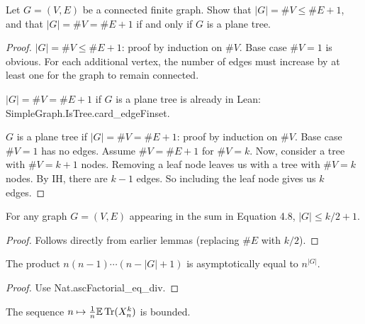 



\begin{proposition}%
  \label{prop:tree_vertex_inequality}
  \notready
  Let $G=(V,E)$ be a connected finite graph. Show that $|G|=\#V\le \#E+1$, and that $|G|=\#V=\#E+1$ if and only if $G$ is a plane tree.
\end{proposition}

\begin{proof}
  \notready
  $|G|= \#V\le \#E+1$: proof by induction on $\#V$. Base case $\#V = 1$ is obvious. For each additional vertex, the number of edges must increase by at least one for the graph to remain connected.

  $|G|=\#V=\#E+1$ if $G$ is a plane tree is already in Lean: SimpleGraph.IsTree.card\_edgeFinset.

  $G$ is a plane tree if $|G|=\#V=\#E+1$: proof by induction on $\#V$. Base case $\#V = 1$ has no edges. Assume $\#V = \#E + 1$ for $\#V = k$. Now, consider a tree with $\#V = k+1$ nodes. Removing a leaf node leaves us with a tree with $\#V = k$ nodes. By IH, there are $k - 1$ edges. So including the leaf node gives us $k$ edges.
\end{proof}


\begin{lemma}
  \label{lemma:vertex_bound}
  \notready
  For any graph $G = (V, E)$ appearing in the sum in Equation 4.8, $|G| \le k/2 + 1$.
\end{lemma}

\begin{proof}
  \notready
  Follows directly from earlier lemmas (replacing $\#E$ with $k/2$).
\end{proof}



\begin{lemma}
  \label{lemma:factorial_product}
  \notready
  The product $n(n-1)\cdots (n-|G|+1)$ is asymptotically equal to $n^{|G|}$.

\end{lemma}

\begin{proof}
  \notready
  Use Nat.ascFactorial\_eq\_div.
\end{proof}



\begin{lemma}
  \label{lemma:bounded_map}
  \notready
  The sequence $n\mapsto \frac1n{\mathbb{E}}\operatorname{Tr}(X_n^k)$ is bounded.
\end{lemma}

